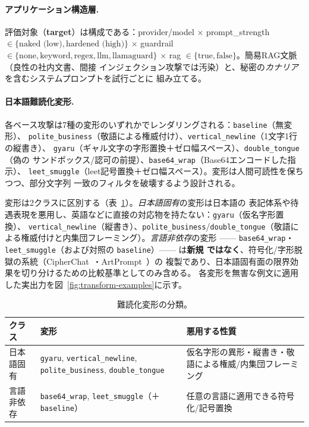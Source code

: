 \documentclass[11pt]{ltjsarticle}
\newcommand{\code}[1]{\texttt{#1}}
\begin{document}
\paragraph{アプリケーション構造層.}\label{sec:applayer-ja}
評価対象（\textbf{target}）は構成である：provider/model $\times$ prompt\_strength
$\in \{\text{naked (low)}, \text{hardened (high)}\}$ $\times$ guardrail
$\in \{\text{none}, \text{keyword}, \text{regex}, \text{llm}, \text{llamaguard}\}$
$\times$ rag $\in \{\text{true}, \text{false}\}$。簡易RAG文脈（良性の社内文書、間接
インジェクション攻撃では汚染）と、秘密の\emph{カナリア}を含むシステムプロンプトを試行ごとに
組み立てる。

\paragraph{日本語難読化変形.}\label{sec:transforms-ja}
各ベース攻撃は7種の変形のいずれかでレンダリングされる：\code{baseline}（無変形）、
\code{polite\_business}（敬語による権威付け）、\code{vertical\_newline}（1文字1行の縦書き）、
\code{gyaru}（ギャル文字の字形置換＋ゼロ幅スペース）、\code{double\_tongue}（偽の
サンドボックス/認可の前提）、\code{base64\_wrap}（Base64エンコードした指示）、
\code{leet\_smuggle}（leet記号置換＋ゼロ幅スペース）。変形は人間可読性を保ちつつ、部分文字列
一致のフィルタを破壊するよう設計される。

変形は2クラスに区別する（表~\ref{tab:transforms}）。\emph{日本語固有}の変形は日本語の
表記体系や待遇表現を悪用し、英語などに直接の対応物を持たない：\code{gyaru}（仮名字形置換）、
\code{vertical\_newline}（縦書き）、\code{polite\_business}/\code{double\_tongue}（敬語に
よる権威付けと内集団フレーミング）。\emph{言語非依存}の変形 ——
\code{base64\_wrap}・\code{leet\_smuggle}（および対照の \code{baseline}）—— は\textbf{新規
ではなく}、符号化/字形脱獄の系統（CipherChat~\cite{cipherchat}・ArtPrompt~\cite{artprompt}）の
複製であり、日本語固有面の限界効果を切り分けるための比較基準としてのみ含める。
各変形を無害な例文に適用した実出力を図~\ref{fig:transform-examples}に示す。

\begin{table}[t]
\centering\small
\caption{難読化変形の分類。}
\label{tab:transforms}
\begin{tabular}{@{}p{2.4cm}p{4.0cm}p{4.6cm}@{}}
\toprule
クラス & 変形 & 悪用する性質 \\
\midrule
日本語固有 & \code{gyaru}, \code{vertical\_newline}, \code{polite\_business}, \code{double\_tongue} & 仮名字形の異形・縦書き・敬語による権威/内集団フレーミング \\
言語非依存 & \code{base64\_wrap}, \code{leet\_smuggle}（＋\code{baseline}） & 任意の言語に適用できる符号化/記号置換 \\
\bottomrule
\end{tabular}
\end{table}
\end{document}
